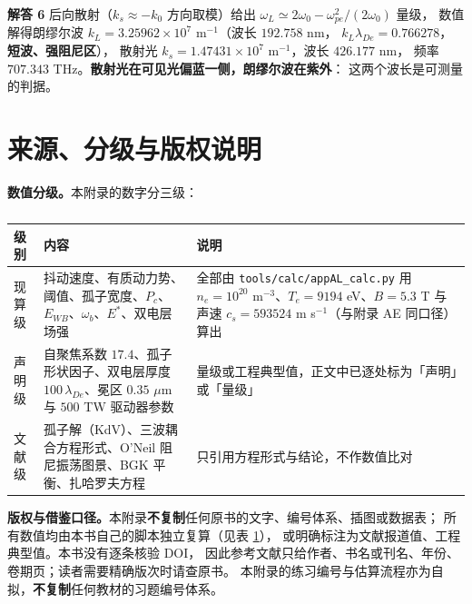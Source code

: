 \textbf{解答 6} 后向散射（$k_s \approx -k_0$ 方向取模）给出
$\omega_L \simeq 2\omega_0 - \omega_{pe}^2/(2\omega_0)$ 量级，
数值解得朗缪尔波 $k_L = 3.25962\times10^{7}$ m$^{-1}$（波长 $192.758$ nm，
$k_L\lambda_{De} = 0.766278$，\textbf{短波、强阻尼区}），
散射光 $k_s = 1.47431\times10^{7}$ m$^{-1}$，波长 $426.177$ nm，
频率 $707.343$ THz。\textbf{散射光在可见光偏蓝一侧，朗缪尔波在紫外}：
这两个波长是可测量的判据。

\section{来源、分级与版权说明}
\label{sec:app-al-source}

\begingroup\small
\textbf{数值分级。}本附录的数字分三级：

\begin{table}[htbp]
\centering
\small
\caption{}
\label{tab:app-al-source}
\begin{tabular}{p{2.2cm}p{4.4cm}p{7.0cm}}
\toprule
级别 & 内容 & 说明 \\
\midrule
现算级 & 抖动速度、有质动力势、阈值、孤子宽度、$P_c$、$E_{WB}$、$\omega_b$、$E^{*}$、双电层场强 & 全部由 \texttt{tools/\allowbreak{}calc/\allowbreak{}appAL\_calc.py} 用 $n_e = 10^{20}$ m$^{-3}$、$T_e = 9194$ eV、$B = 5.3$ T 与声速 $c_s = 593524$ m s$^{-1}$（与附录 AE 同口径）算出 \\
声明级 & 自聚焦系数 $17.4$、孤子形状因子、双电层厚度 $100\,\lambda_{De}$、冕区 $0.35$ $\mu$m 与 $500$ TW 驱动器参数 & 量级或工程典型值，正文中已逐处标为「声明」或「量级」 \\
文献级 & 孤子解（KdV）、三波耦合方程形式、O'Neil 阻尼振荡图景、BGK 平衡、扎哈罗夫方程 & 只引用方程形式与结论，不作数值比对 \\
\bottomrule
\end{tabular}

\end{table}

\textbf{版权与借鉴口径。}本附录\textbf{不复制}任何原书的文字、编号体系、插图或数据表；
所有数值均由本书自己的脚本独立复算（见表 \ref{tab:app-al-source}），
或明确标注为文献报道值、工程典型值。本书没有逐条核验 DOI，
因此参考文献只给作者、书名或刊名、年份、卷期页；读者需要精确版次时请查原书。
本附录的练习编号与估算流程亦为自拟，\textbf{不复制}任何教材的习题编号体系。

